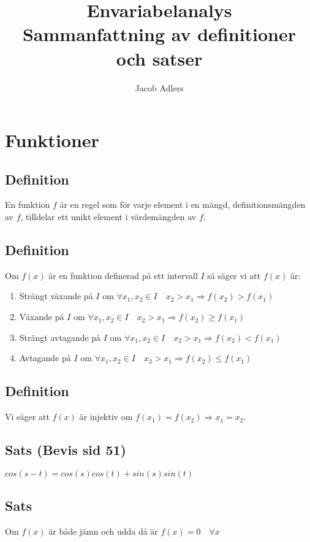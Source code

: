 \documentclass{article}
\title{Envariabelanalys\\Sammanfattning av definitioner och satser}
\author{Jacob Adlers}
\begin{document}
\maketitle
\newpage

\tableofcontents
\newpage

\section{Funktioner}
\subsection{Definition}
En funktion $f$ är en regel som för varje element i en mängd, definitionsmängden av $f$, tilldelar ett unikt element i värdemängden av $f$.

\subsection{Definition}
Om $f(x)$ är en funktion definerad på ett intervall $I$ så säger vi att $f(x)$ är:

\begin{enumerate}
   \item Strängt växande på $I$ om $\forall x_{1},x_{2}\in I \quad x_{2}>x_{1} \Rightarrow f(x_{2})>f(x_{1})$
   \item Växande på $I$ om $\forall x_{1},x_{2}\in I \quad x_{2}>x_{1} \Rightarrow f(x_{2})\geq f(x_{1})$
   \item Strängt avtagande på $I$ om $\forall x_{1},x_{2}\in I \quad x_{2}>x_{1} \Rightarrow f(x_{2})<f(x_{1})$
   \item Avtagande på $I$ om $\forall x_{1},x_{2}\in I \quad x_{2}>x_{1} \Rightarrow f(x_{2})\leq f(x_{1})$
\end{enumerate}

\subsection{Definition}
Vi säger att $f(x)$ är injektiv om $f(x_{1})=f(x_{2})\Rightarrow x_{1}=x_{2}$.

\subsection{Sats (Bevis sid 51)}
$cos(s-t)=cos(s)cos(t)+sin(s)sin(t)$

\subsection{Sats}
Om $f(x)$ är både jämn och udda då är $f(x)=0 \quad \forall x $
\end{document}
